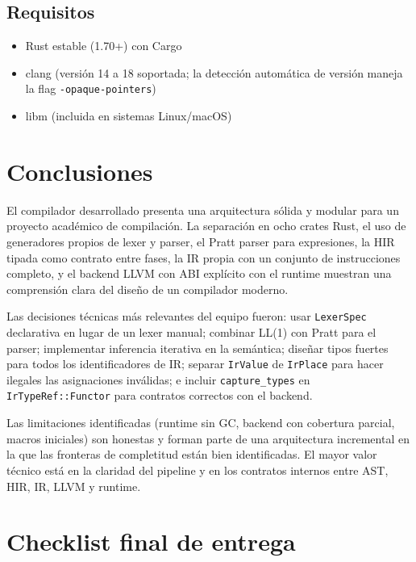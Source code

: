 \documentclass[12pt,letterpaper]{article}
\newcommand{\src}[1]{\texttt{#1}}
\begin{document}
\subsection{Requisitos}

\begin{itemize}
    \item Rust estable (1.70+) con Cargo
    \item clang (versión 14 a 18 soportada; la detección automática de versión maneja la flag \src{-opaque-pointers})
    \item libm (incluida en sistemas Linux/macOS)
\end{itemize}

\section{Conclusiones}

El compilador desarrollado presenta una arquitectura sólida y modular para un proyecto académico de compilación. La separación en ocho crates Rust, el uso de generadores propios de lexer y parser, el Pratt parser para expresiones, la HIR tipada como contrato entre fases, la IR propia con un conjunto de instrucciones completo, y el backend LLVM con ABI explícito con el runtime muestran una comprensión clara del diseño de un compilador moderno.

Las decisiones técnicas más relevantes del equipo fueron: usar \src{LexerSpec} declarativa en lugar de un lexer manual; combinar LL(1) con Pratt para el parser; implementar inferencia iterativa en la semántica; diseñar tipos fuertes para todos los identificadores de IR; separar \src{IrValue} de \src{IrPlace} para hacer ilegales las asignaciones inválidas; e incluir \src{capture\_types} en \src{IrTypeRef::Functor} para contratos correctos con el backend.

Las limitaciones identificadas (runtime sin GC, backend con cobertura parcial, macros iniciales) son honestas y forman parte de una arquitectura incremental en la que las fronteras de completitud están bien identificadas. El mayor valor técnico está en la claridad del pipeline y en los contratos internos entre AST, HIR, IR, LLVM y runtime.

\appendix
\section{Checklist final de entrega}
\end{document}

